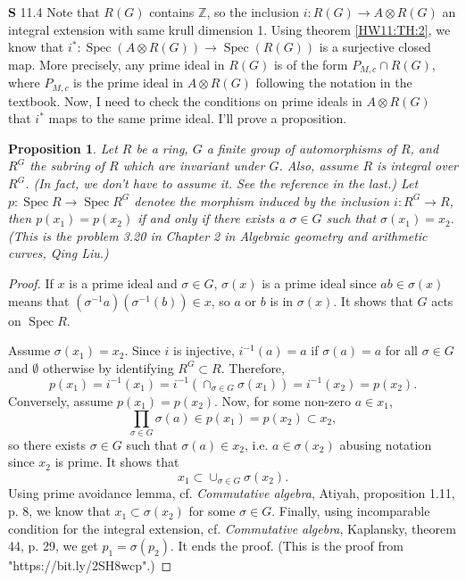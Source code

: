 \documentclass[a4paper, 12pt]{article}
\theoremstyle{Mydefinition}
\theoremstyle{Mytheorem}
\newtheorem{proposition}[statement]{Proposition}
\DeclareMathOperator{\Spec}{Spec}
\begin{document}
\noindent \textbf{S} 11.4
Note that $R(G)$ contains $\mathbb{Z}$, so the inclusion $i:R(G)\rightarrow A\otimes R(G)$ an integral extension with same krull dimension 1. Using theorem \ref{HW11:TH:2}, we know that $i^*:\Spec(A\otimes R(G))\rightarrow \Spec(R(G))$ is a surjective closed map. More precisely, any prime ideal in $R(G)$ is of the form $P_{M, c}\cap R(G)$, where $P_{M,c}$ is the prime ideal in $A\otimes R(G)$ following the notation in the textbook. Now, I need to check the conditions on prime ideals in $A\otimes R(G)$ that $i^*$ maps to the same prime ideal. I'll prove a proposition.
\begin{proposition}
Let $R$ be a ring, $G$ a finite group of automorphisms of $R$, and $R^G$ the subring of $R$ which are invariant under $G$. Also, assume $R$ is integral over $R^G$. (In fact, we don't have to assume it. See the reference in the last.) Let $p:\Spec R\rightarrow \Spec R^G$ denotee the morphism induced by the inclusion $i:R^G\rightarrow R$, then $p(x_1)=p(x_2)$ if and only if there exists a $\sigma\in G$ such that $\sigma(x_1)=x_2$.(This is the problem 3.20 in Chapter 2 in \textit{Algebraic geometry and arithmetic curves}, Qing Liu.)
\end{proposition}
\begin{proof}
If $x$ is a prime ideal and $\sigma\in G$, $\sigma(x)$ is a prime ideal since $ab\in \sigma(x)$ means that $(\sigma^{-1}a)(\sigma^{-1}(b))\in x$, so $a$ or $b$ is in $\sigma(x)$. It shows that $G$ acts on $\Spec R$.

Assume $\sigma(x_1)=x_2$. Since $i$ is injective, $i^{-1}(a)=a$ if $\sigma(a)=a$ for all $\sigma \in G$ and $\emptyset$ otherwise by identifying $R^G\subset R$. Therefore,
\begin{equation}
    p(x_1) = i^{-1}(x_1) = i^{-1}\left(\cap_{\sigma \in G}\sigma(x_1)\right) = i^{-1}(x_2) = p(x_2).
\end{equation}
Conversely, assume $p(x_1)=p(x_2)$. Now, for some non-zero $a \in x_1$, 
\begin{equation}
    \prod_{\sigma\in G}\sigma(a)\in p(x_1)=p(x_2)\subset x_2,
\end{equation}
so there exists $\sigma\in G$ such that $\sigma(a)\in x_2$, i.e. $a\in \sigma(x_2)$ abusing notation since $x_2$ is prime. It shows that
\begin{equation}
    x_1\subset \cup_{\sigma\in G}\sigma(x_2).
\end{equation}
Using prime avoidance lemma, cf. \textit{Commutative algebra}, Atiyah, proposition 1.11, p. 8, we know that $x_1\subset \sigma(x_2)$ for some $\sigma\in G$. Finally, using incomparable condition for the integral extension, cf. \textit{Commutative algebra}, Kaplansky, theorem 44, p. 29, we get $p_1=\sigma(p_2)$. It ends the proof.
(This is the proof from "https://bit.ly/2SH8wcp".)
\end{proof}
\end{document}
